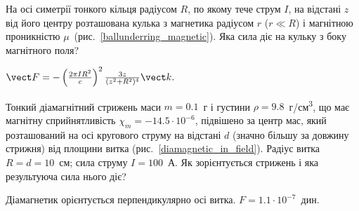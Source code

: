 \begin{problem}\label{prb:ballunderring_magnetic}
На осі симетрії тонкого кільця радіусом $R$, по якому тече струм $I$, на відстані $z$ від його центру розташована кулька з магнетика радіусом $r$ ($r \ll R$) і магнітною проникністю $\mu$~(рис.~\ref{ballunderring_magnetic}). Яка сила діє на кульку з боку магнітного поля?
\begin{solution}
	$\vect F = - \left( \frac{2\pi IR^2}{c}\right)^2 \frac{3z}{(z^2 + R^2)^4} \vect k.$
\end{solution}
\end{problem}

\begin{problem}\label{prb:diamagnetic_in_field}
    Тонкий діамагнітний стрижень маси $m = 0.1$~г і густини $\rho = 9.8$~г/см\textsuperscript{3}, що має магнітну сприйнятливість $\chi_m = - 14.5\cdot 10^{-6}$, підвішено за центр мас, який розташований на осі кругового струму на відстані $d$ (значно більшу за довжину стрижня) від площини витка (рис.~\ref{diamagnetic_in_field}). Радіус витка $R = d = 10$~см; сила струму $I = 100$~А. Як зорієнтується стрижень і яка результуюча сила нього діє?
\begin{solution}
	Діамагнетик орієнтується перпендикулярно осі витка. $F = 1.1\cdot 10^{-7}$~дин.
\end{solution}
\end{problem}

